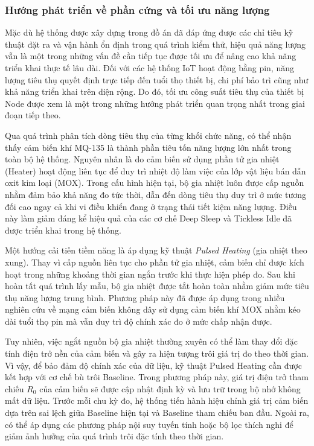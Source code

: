 \subsubsection{Hướng phát triển về phần cứng và tối ưu năng lượng}

Mặc dù hệ thống được xây dựng trong đồ án đã đáp ứng được các chỉ tiêu kỹ thuật đặt ra và vận hành ổn định trong quá trình kiểm thử, hiệu quả năng lượng vẫn là một trong những vấn đề cần tiếp tục được tối ưu để nâng cao khả năng triển khai thực tế lâu dài. Đối với các hệ thống IoT hoạt động bằng pin, năng lượng tiêu thụ quyết định trực tiếp đến tuổi thọ thiết bị, chi phí bảo trì cũng như khả năng triển khai trên diện rộng. Do đó, tối ưu công suất tiêu thụ của thiết bị Node được xem là một trong những hướng phát triển quan trọng nhất trong giai đoạn tiếp theo.

Qua quá trình phân tích dòng tiêu thụ của từng khối chức năng, có thể nhận thấy cảm biến khí MQ-135 là thành phần tiêu tốn năng lượng lớn nhất trong toàn bộ hệ thống. Nguyên nhân là do cảm biến sử dụng phần tử gia nhiệt (Heater) hoạt động liên tục để duy trì nhiệt độ làm việc của lớp vật liệu bán dẫn oxit kim loại (MOX). Trong cấu hình hiện tại, bộ gia nhiệt luôn được cấp nguồn nhằm đảm bảo khả năng đo tức thời, dẫn đến dòng tiêu thụ duy trì ở mức tương đối cao ngay cả khi vi điều khiển đang ở trạng thái tiết kiệm năng lượng. Điều này làm giảm đáng kể hiệu quả của các cơ chế Deep Sleep và Tickless Idle đã được triển khai trong hệ thống.

Một hướng cải tiến tiềm năng là áp dụng kỹ thuật \textit{Pulsed Heating} (gia nhiệt theo xung). Thay vì cấp nguồn liên tục cho phần tử gia nhiệt, cảm biến chỉ được kích hoạt trong những khoảng thời gian ngắn trước khi thực hiện phép đo. Sau khi hoàn tất quá trình lấy mẫu, bộ gia nhiệt được tắt hoàn toàn nhằm giảm mức tiêu thụ năng lượng trung bình. Phương pháp này đã được áp dụng trong nhiều nghiên cứu về mạng cảm biến không dây sử dụng cảm biến khí MOX nhằm kéo dài tuổi thọ pin mà vẫn duy trì độ chính xác đo ở mức chấp nhận được.

Tuy nhiên, việc ngắt nguồn bộ gia nhiệt thường xuyên có thể làm thay đổi đặc tính điện trở nền của cảm biến và gây ra hiện tượng trôi giá trị đo theo thời gian. Vì vậy, để bảo đảm độ chính xác của dữ liệu, kỹ thuật Pulsed Heating cần được kết hợp với cơ chế bù trôi Baseline. Trong phương pháp này, giá trị điện trở tham chiếu $R_0$ của cảm biến sẽ được cập nhật định kỳ và lưu trữ trong bộ nhớ không mất dữ liệu. Trước mỗi chu kỳ đo, hệ thống tiến hành hiệu chỉnh giá trị cảm biến dựa trên sai lệch giữa Baseline hiện tại và Baseline tham chiếu ban đầu. Ngoài ra, có thể áp dụng các phương pháp nội suy tuyến tính hoặc bộ lọc thích nghi để giảm ảnh hưởng của quá trình trôi đặc tính theo thời gian.

